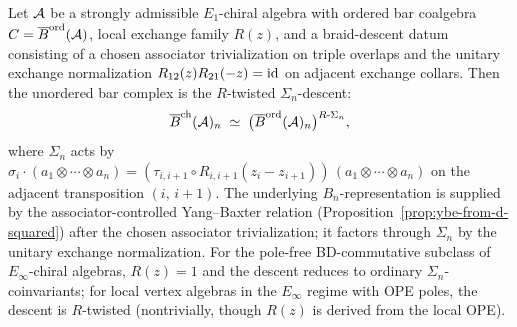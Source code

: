 \begin{proposition}
\label{prop:r-matrix-descent}
Let $\mathcal{A}$ be a strongly admissible $E_1$-chiral algebra with
ordered bar coalgebra $C=\overline{B}^{\mathrm{ord}}(\mathcal{A})$, local exchange family
$R(z)$, and a braid-descent datum consisting of a chosen associator
trivialization on triple overlaps and the unitary exchange
normalization \(R_{12}(z)R_{21}(-z)=\mathrm{id}\) on adjacent exchange
collars. Then the unordered bar complex is the
$R$-twisted $\Sigma_n$-descent:
\begin{equation}\label{eq:descent-identification}
\overline{B}^{\mathrm{ch}}(\mathcal{A})_n
\;\simeq\;
\bigl(\overline{B}^{\mathrm{ord}}(\mathcal{A})_n\bigr)^{R\text{-}\Sigma_n},
\end{equation}
where $\Sigma_n$ acts by $\sigma_i\cdot(a_1\otimes\cdots\otimes a_n)
=(\tau_{i,i+1}\circ R_{i,i+1}(z_i{-}z_{i+1}))\,
(a_1\otimes\cdots\otimes a_n)$
on the adjacent transposition $(i,\,i{+}1)$. The
underlying \(B_n\)-representation is supplied by the
associator-controlled Yang--Baxter relation
\textup{(}Proposition~\ref{prop:ybe-from-d-squared}\textup{)} after
the chosen associator trivialization; it factors through \(\Sigma_n\)
by the unitary exchange normalization.
For the pole-free BD-commutative subclass of
$E_\infty$-chiral algebras, $R(z)=1$ and the descent
reduces to ordinary $\Sigma_n$-coinvariants; for local
vertex algebras in the $E_\infty$ regime with OPE poles, the descent is
$R$-twisted (nontrivially, though $R(z)$ is derived from
the local OPE).
\end{proposition}

